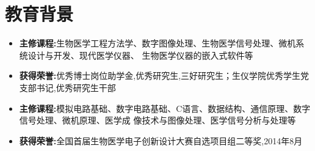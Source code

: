 \documentclass{resume}
\begin{document}




\section{教育背景}
\begin{itemize}
    \item \textbf{主修课程:}生物医学工程方法学、数字图像处理、生物医学信号处理、微机系统设计与开发、现代医学仪器、
    生物医学仪器的嵌入式软件等
    \item \textbf{获得荣誉:}优秀博士岗位助学金,优秀研究生,三好研究生；生仪学院优秀学生党支部书记,优秀研究生干部
\end{itemize}
\begin{itemize}
    \item \textbf{主修课程:}模拟电路基础、数字电路基础、C语言、数据结构、通信原理、数字信号处理、微机原理、医学成
    像技术与图像处理、医学信号分析与处理等
    \item \textbf{获得荣誉:}全国首届生物医学电子创新设计大赛自选项目组二等奖,2014年8月
\end{itemize}
\end{document}
